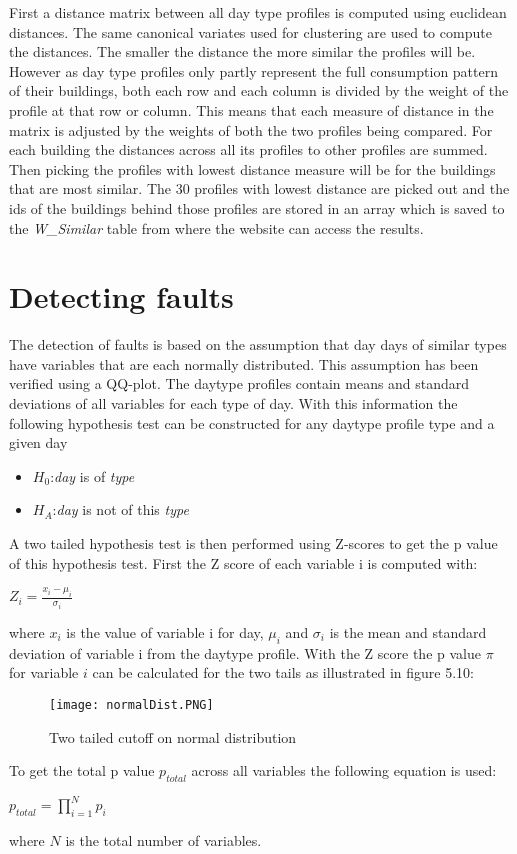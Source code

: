 First a distance matrix between all day type profiles is computed using euclidean distances. The same canonical variates used for clustering are used to compute the distances. The smaller the distance the more similar the profiles will be. However as day type profiles only partly represent the full consumption pattern of their buildings, both each row and each column is divided by the weight of the profile at that row or column. This means that each measure of distance in the matrix is adjusted by the weights of both the two profiles being compared. For each building the distances across all its profiles to other profiles are summed. Then picking the profiles with lowest distance measure will be for the buildings that are most similar. The 30 profiles with lowest distance are picked out and the ids of the buildings behind those profiles are stored in an array which is saved to the \emph{W\_Similar} table from where the website can access the results.
\section{Detecting faults}
The detection of faults is based on the assumption that day days of similar types have variables that are each normally distributed. This assumption has been verified using a QQ-plot. The daytype profiles contain means and standard deviations of all variables for each type of day. With this information the following hypothesis test can be constructed for any daytype profile type and a given day
\begin{itemize}
\item $H_0$:\emph{day} is of \emph{type}
\item $H_A$:\emph{day} is not of this \emph{type}
\end{itemize}
A two tailed hypothesis test is then performed using Z-scores to get the p value of this hypothesis test. First the Z score of each variable i is computed with:
\begin{center}
$Z_i=\frac{x_i-\mu_i}{\sigma_i}$
\end{center}
where $x_i$ is the value of variable i for day, $\mu_i$ and $\sigma_i$ is the mean and standard deviation of variable i from the daytype profile. With the Z score the p value $\pi$ for variable $i$ can be calculated for the two tails as illustrated in figure 5.10:
\begin{figure}
\begin{center}
\texttt{[image: normalDist.PNG]}
\end{center}
\caption{Two tailed cutoff on normal distribution}
\end{figure}
To get the total p value $p_{total}$ across all variables the following equation is used:
\begin{center}
$p_{total}=\displaystyle\prod_{i=1}^N p_i$
\end{center}
where $N$ is the total number of variables.

